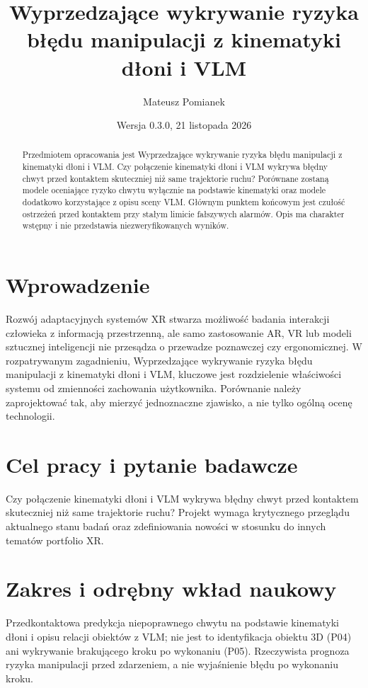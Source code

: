 \documentclass[11pt,a4paper]{article}
\title{Wyprzedzające wykrywanie ryzyka błędu manipulacji z kinematyki dłoni i VLM}
\author{Mateusz Pomianek}
\date{Wersja 0.3.0, 21 listopada 2026}
\begin{document}
\maketitle

\begin{abstract}

Przedmiotem opracowania jest Wyprzedzające wykrywanie ryzyka błędu manipulacji z kinematyki dłoni i VLM. Czy połączenie kinematyki dłoni i VLM wykrywa błędny chwyt przed kontaktem skuteczniej niż same trajektorie ruchu? Porównane zostaną modele oceniające ryzyko chwytu wyłącznie na podstawie kinematyki oraz modele dodatkowo korzystające z opisu sceny VLM. Głównym punktem końcowym jest czułość ostrzeżeń przed kontaktem przy stałym limicie fałszywych alarmów. Opis ma charakter wstępny i nie przedstawia niezweryfikowanych wyników.

\end{abstract}

\section{Wprowadzenie}

Rozwój adaptacyjnych systemów XR stwarza możliwość badania interakcji człowieka z informacją przestrzenną, ale samo zastosowanie AR, VR lub modeli sztucznej inteligencji nie przesądza o przewadze poznawczej czy ergonomicznej. W rozpatrywanym zagadnieniu, Wyprzedzające wykrywanie ryzyka błędu manipulacji z kinematyki dłoni i VLM, kluczowe jest rozdzielenie właściwości systemu od zmienności zachowania użytkownika. Porównanie należy zaprojektować tak, aby mierzyć jednoznaczne zjawisko, a nie tylko ogólną ocenę technologii.

\section{Cel pracy i pytanie badawcze}

Czy połączenie kinematyki dłoni i VLM wykrywa błędny chwyt przed kontaktem skuteczniej niż same trajektorie ruchu? Projekt wymaga krytycznego przeglądu aktualnego stanu badań oraz zdefiniowania nowości w stosunku do innych tematów portfolio XR.

\section{Zakres i odrębny wkład naukowy}
Przedkontaktowa predykcja niepoprawnego chwytu na podstawie kinematyki dłoni i opisu relacji obiektów z VLM; nie jest to identyfikacja obiektu 3D (P04) ani wykrywanie brakującego kroku po wykonaniu (P05). Rzeczywista prognoza ryzyka manipulacji przed zdarzeniem, a nie wyjaśnienie błędu po wykonaniu kroku.
\end{document}
